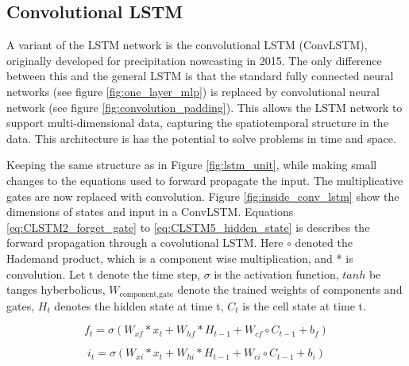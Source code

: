 \subsection{Convolutional LSTM}  \label{sec:convolutional_lstm}
A variant of the LSTM network is the convolutional LSTM (ConvLSTM), originally developed for precipitation nowcasting in 2015. The only difference between this and the general LSTM is that the standard fully connected neural networks (see figure \ref{fig:one_layer_mlp}) is replaced by convolutional neural network (see figure \ref{fig:convolution_padding}). This allows the LSTM network to support multi-dimensional data, capturing the spatiotemporal structure in the data. This architecture is has the potential to solve problems in time and space.



Keeping the same structure as in Figure \ref{fig:lstm_unit}, while making small changes to the equations used to forward propagate the input. The multiplicative gates are now replaced with convolution. 
Figure \ref{fig:inside_conv_lstm} show the dimensions of states and input in a ConvLSTM. Equations \eqref{eq:CLSTM2_forget_gate} to \eqref{eq:CLSTM5_hidden_state} is describes the forward propagation through a covolutional LSTM. Here $\circ$ denoted the Hademand product, which is a component wise multiplication, and * is convolution. Let t denote the time step, $\sigma$ is the activation function, $tanh$ be tanges hyberbolicus, $W_{\text{component}, \text{gate}}$ denote the trained weights of components and gates, $H_{t}$ denotes the hidden state at time t, $C_{t}$ is the cell state at time t. 

\begin{equation} \label{eq:CLSTM2_forget_gate}
        f_t = \sigma \left( W_{xf}*x_t + W_{hf}*H_{t-1} + W_{cf}\circ C_{t-1}+b_f \right)
\end{equation}

\begin{equation} \label{eq:CLSTM1_input_gate}
    i_t = \sigma \left( W_{xi}*x_t + W_{hi}*H_{t-1} + W_{ci}\circ C_{t-1}+b_i \right) 
\end{equation}

